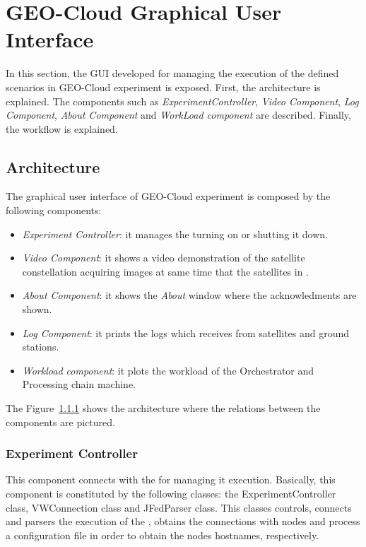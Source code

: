 \section{GEO-Cloud Graphical User Interface}

In this section, the \ac{GUI} developed for managing the execution of the defined
scenarios in GEO-Cloud experiment is exposed. First, the architecture is
explained. The components such as \emph{ExperimentController}, \emph{Video
  Component}, \emph{Log Component}, \emph{About Component} and \emph{WorkLoad component} are described. Finally, the workflow is explained.

\subsection{Architecture}

The graphical user interface of GEO-Cloud experiment is composed by the following components:

\begin{itemize}

\item \emph{Experiment Controller}: it manages the \sss turning on or shutting it down.
\item \emph{Video Component}: it shows a video demonstration of the satellite constellation acquiring images at same time that the satellites in \vw.
\item \emph{About Component}: it shows the \emph{About} window where the acknowledments are shown.
\item \emph{Log Component}: it prints the logs which receives from satellites and ground stations.
\item \emph{Workload component}: it plots the workload of the Orchestrator and Processing chain machine.

\end{itemize}

The Figure~\ref{} shows the architecture where the relations between the components are pictured.


\subsubsection{Experiment Controller}

This component connects with the \sss for managing it execution. Basically, this component is constituted by the following classes: the ExperimentController class, VWConnection class and JFedParser class. This classes controls, connects and parsers the execution of the \sss, obtains the connections with \sss nodes and process a configuration file in order to obtain the \sss nodes hostnames, respectively.

